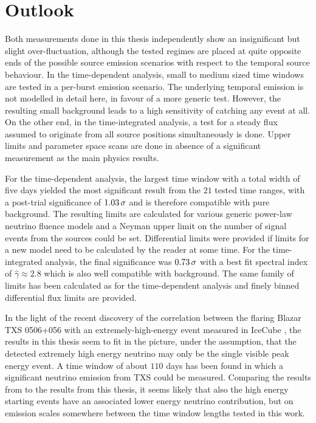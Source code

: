 \chapter{Outlook}

Both measurements done in this thesis independently show an insignificant but slight over-fluctuation, although the tested regimes are placed at quite opposite ends of the possible source emission scenarios with respect to the temporal source behaviour.
In the time-dependent analysis, small to medium sized time windows are tested in a per-burst emission scenario.
The underlying temporal emission is not modelled in detail here, in favour of a more generic test.
However, the resulting small background leads to a high sensitivity of catching any event at all.
On the other end, in the time-integrated analysis, a test for a steady flux assumed to originate from all source positions simultaneously is done.
Upper limits and parameter space scans are done in absence of a significant measurement as the main physics results.

For the time-dependent analysis, the largest time window with a total width of five days yielded the most significant result from the $\num{21}$ tested time ranges, with a post-trial significance of $\num{1.03}\,\sigma$ and is therefore compatible with pure background.
The resulting limits are calculated for various generic power-law neutrino fluence models and a Neyman upper limit on the number of signal events from the sources could be set.
Differential limits were provided if limits for a new model need to be calculated by the reader at some time.
For the time-integrated analysis, the final significance was $\num{0.73}\,\sigma$ with a best fit spectral index of $\hat{\gamma} \approx 2.8$ which is also well compatible with background.
The same family of limits has been calculated as for the time-dependent analysis and finely binned differential flux limits are provided.

In the light of the recent discovery of the correlation between the flaring Blazar TXS 0506+056 with an extremely-high-energy event measured in IceCube \cite{IceCube:2018dnn}, the results in this thesis seem to fit in the picture, under the assumption, that the detected extremely high energy neutrino may only be the single visible peak energy event.
A time window of about $\num{110}$ days has been found in which a significant neutrino emission from TXS could be measured.
Comparing the results from \cite{IceCube:2018cha,IceCube:2018dnn} to the results from this thesis, it seems likely that also the high energy starting events have an associated lower energy neutrino contribution, but on emission scales somewhere between the time window lengths tested in this work.

